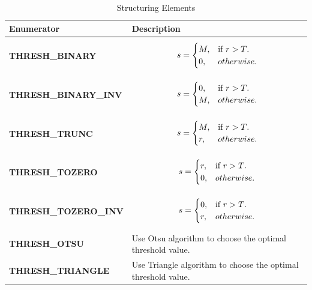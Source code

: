 \documentclass{article}
\theoremstyle{definition}
\theoremstyle{remark}
\begin{document}
\begin{table}[h!]
    \centering
    \def\arraystretch{1.1}%
    \begin{tabular}{ p{5cm} p{7cm} } 
	\hline
	Enumerator & Description \\
	\hline
	\textbf{\footnotesize{THRESH\_BINARY}} & 
	\begin{equation*}
	    s =\begin{cases}
		M, & \text{if $ r > T$}.\\
		0, & otherwise.
	    \end{cases}
	\end{equation*}\\

	\textbf{\footnotesize{THRESH\_BINARY\_INV}} & 
	\begin{equation*}
	    s =\begin{cases}
		0, & \text{if $ r > T$}.\\
		M, & otherwise.
	    \end{cases}
	\end{equation*}\\

	\textbf{\footnotesize{THRESH\_TRUNC}} & 
	\begin{equation*}
	    s =\begin{cases}
		M, & \text{if $ r > T$}.\\
		r, & otherwise.
	    \end{cases}
	\end{equation*}\\

	\textbf{\footnotesize{THRESH\_TOZERO}} & 
	\begin{equation*}
	    s =\begin{cases}
		r, & \text{if $ r > T$}.\\
		0, & otherwise.
	    \end{cases}
	\end{equation*}\\

	\textbf{\footnotesize{THRESH\_TOZERO\_INV}} & 
	\begin{equation*}
	    s =\begin{cases}
		0, & \text{if $ r > T$}.\\
		r, & otherwise.
	    \end{cases}
	\end{equation*}\\

	\textbf{\footnotesize{THRESH\_OTSU}} & Use Otsu algorithm to choose the optimal threshold value. \\

	\textbf{\footnotesize{THRESH\_TRIANGLE}} & Use Triangle algorithm to choose the optimal threshold value. \\
	\hline
    \end{tabular}
    \caption{Structuring Elements}
    \label{table:col_struct_el}
\end{table}
\end{document}

